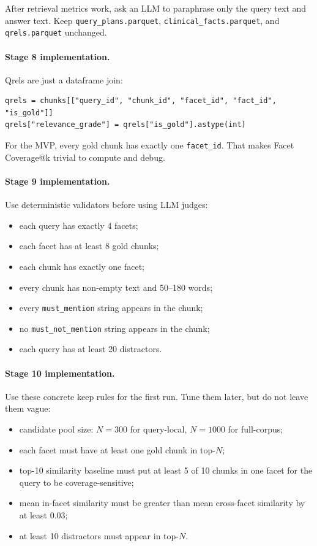 \documentclass[11pt,a4paper]{article}
\newcommand{\field}[1]{\texttt{#1}}
\begin{document}
After retrieval metrics work, ask an LLM to paraphrase only the query text and answer text. Keep \field{query\_plans.parquet}, \field{clinical\_facts.parquet}, and \field{qrels.parquet} unchanged.

\paragraph{Stage 8 implementation.}
Qrels are just a dataframe join:

\begin{lstlisting}[style=promptstyle]
qrels = chunks[["query_id", "chunk_id", "facet_id", "fact_id", "is_gold"]]
qrels["relevance_grade"] = qrels["is_gold"].astype(int)
\end{lstlisting}

For the MVP, every gold chunk has exactly one \field{facet\_id}. That makes Facet Coverage@k trivial to compute and debug.

\paragraph{Stage 9 implementation.}
Use deterministic validators before using LLM judges:

\begin{itemize}[leftmargin=*]
	\item each query has exactly 4 facets;
	\item each facet has at least 8 gold chunks;
	\item each chunk has exactly one facet;
	\item every chunk has non-empty text and 50--180 words;
	\item every \field{must\_mention} string appears in the chunk;
	\item no \field{must\_not\_mention} string appears in the chunk;
	\item each query has at least 20 distractors.
\end{itemize}

\paragraph{Stage 10 implementation.}
Use these concrete keep rules for the first run. Tune them later, but do not leave them vague:

\begin{itemize}[leftmargin=*]
	\item candidate pool size: $N=300$ for query-local, $N=1000$ for full-corpus;
	\item each facet must have at least one gold chunk in top-$N$;
	\item top-10 similarity baseline must put at least 5 of 10 chunks in one facet for the query to be coverage-sensitive;
	\item mean in-facet similarity must be greater than mean cross-facet similarity by at least 0.03;
	\item at least 10 distractors must appear in top-$N$.
\end{itemize}
\end{document}
